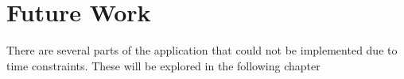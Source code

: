 \documentclass[../../master.tex]{subfiles}
\begin{document}
\chapter{Future Work}
There are several parts of the
application that could not be
implemented due to time constraints.
These will be explored in the following chapter





\end{document}
